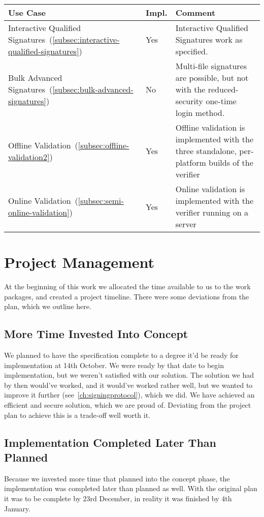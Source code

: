 \begin{center}
    \begin{longtable}{p{5.35cm}|p{0.7cm}|p{9.0cm}}
        \textbf{Use Case} & \textbf{Impl.} & \textbf{Comment}
        \\
        \hline
        Interactive Qualified Signatures~(\ref{subsec:interactive-qualified-signatures})
        & Yes
        & Interactive Qualified Signatures work as specified.
        \\
        \hline
        Bulk Advanced Signatures~(\ref{subsec:bulk-advanced-signatures})
        & No
        & Multi-file signatures are possible,
        but not with the reduced-security one-time login method.
        \\
        \hline
        Offline Validation~(\ref{subsec:offline-validation2})
        & Yes
        & Offline validation is implemented with the three standalone,
        per-platform builds of the verifier
        \\
        \hline
        Online Validation~(\ref{subsec:semi-online-validation})
        & Yes
        & Online validation is implemented with the verifier running on a server
        \\
        \hline
    \end{longtable}
\end{center}


\section{Project Management}\label{sec:project-management}
At the beginning of this work we allocated the time available to us
to the work packages, and created a project timeline.
There were some deviations from the plan,
which we outline here.

\subsection{More Time Invested Into Concept}\label{subsec:more-time-invested-into-concept}
We planned to have the specification complete to a degree it'd be ready for implementation at 14th October.
We were ready by that date to begin implementation,
but we weren't satisfied with our solution.
The solution we had by then would've worked, and it would've worked rather well,
but we wanted to improve it further (see~\ref{ch:signingprotocol}), which we did.
We have achieved an efficient and secure solution, which we are proud of.
Deviating from the project plan to achieve this is a trade-off well worth it.

\subsection{Implementation Completed Later Than Planned}\label{subsec:implementation-completed-later-than-planned}
Because we invested more time that planned into the concept phase,
the implementation was completed later than planned as well.
With the original plan it was to be complete by 23rd December, in reality it was finished by 4th January.

